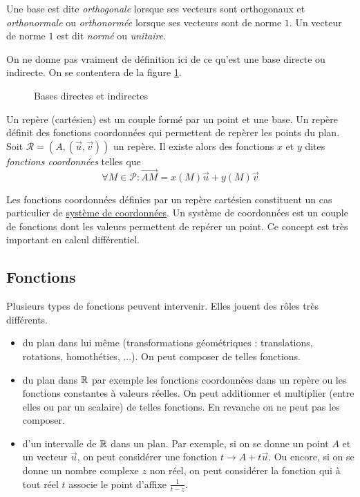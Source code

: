 \begin{defi}
 Une base est dite \emph{orthogonale} lorsque ses vecteurs sont orthogonaux et \emph{orthonormale} ou \emph{orthonormée} lorsque ses vecteurs sont de norme $1$. Un vecteur de norme $1$ est dit \emph{normé} ou \emph{unitaire}. 
\end{defi}
\begin{rem}
 On ne donne pas vraiment de définition ici de ce qu'est une base directe ou indirecte. On se contentera de la figure \ref{fig:C2005_4}.
\end{rem}
\begin{figure}[ht]
 \centering
 
 \caption{Bases directes et indirectes}
 \label{fig:C2005_4}
\end{figure}
\begin{defi}[repère]
 Un repère (cartésien) est un couple formé par un point et une base. Un repère définit des fonctions coordonnées qui permettent de repèrer les points du plan.\newline
Soit $\mathcal R = \left(A,(\overrightarrow u , \overrightarrow v) \right)$ un repère. Il existe alors des fonctions $x$ et $y$ dites \emph{fonctions coordonnées} telles que
\begin{displaymath}
 \forall M\in \mathcal P : \overrightarrow{AM}=x(M)\overrightarrow u + y(M)\overrightarrow v
\end{displaymath}
\end{defi}
\begin{rem}
 Les fonctions coordonnées définies par un repère cartésien constituent un cas particulier de \href{\baseurl C2268.pdf}{système de coordonnées}. Un système de coordonnées est un couple de fonctions dont les valeurs permettent de repérer un point. Ce concept est très important en calcul différentiel.
\end{rem}

\subsection{Fonctions}
Plusieurs types de fonctions peuvent intervenir. Elles jouent des rôles très différents.
\begin{itemize}
 \item du plan dans lui même (transformations géométriques : translations, rotations, homothéties, ...). On peut composer de telles fonctions.
 \item du plan dans $\mathbb{R}$ par exemple les fonctions coordonnées dans un repère ou les fonctions constantes à valeurs réelles. On peut additionner et multiplier (entre elles ou par un scalaire) de telles fonctions. En revanche on ne peut pas les composer.
 \item d'un intervalle de $\mathbb{R}$ dans un plan. Par exemple, si on se donne un point $A$ et un vecteur $\overrightarrow u$, on peut considérer une fonction $t\rightarrow A + t\overrightarrow u$. Ou encore, si on se donne un nombre complexe $z$ non réel, on peut considérer la fonction qui à tout réel $t$ associe le point d'affixe $\frac{1}{t-z}$.   
\end{itemize}

